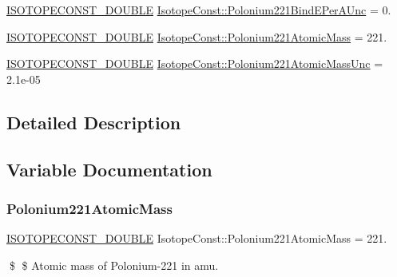 \begin{DoxyCompactItemize}
\mbox{\hyperlink{group___isotope_const-_macros_ga8f45a7272ce02c0b4c65c44636ed719a}{I\+S\+O\+T\+O\+P\+E\+C\+O\+N\+S\+T\+\_\+\+D\+O\+U\+B\+LE}} \mbox{\hyperlink{group___isotope_const-_polonium-_po221_gae882504366358f4c5ef70f4c170511be}{Isotope\+Const\+::\+Polonium221\+Bind\+E\+Per\+A\+Unc}} = 0.
\item 
\mbox{\hyperlink{group___isotope_const-_macros_ga8f45a7272ce02c0b4c65c44636ed719a}{I\+S\+O\+T\+O\+P\+E\+C\+O\+N\+S\+T\+\_\+\+D\+O\+U\+B\+LE}} \mbox{\hyperlink{group___isotope_const-_polonium-_po221_gacbb3136858462922944b43b2a12a97c8}{Isotope\+Const\+::\+Polonium221\+Atomic\+Mass}} = 221.
\item 
\mbox{\hyperlink{group___isotope_const-_macros_ga8f45a7272ce02c0b4c65c44636ed719a}{I\+S\+O\+T\+O\+P\+E\+C\+O\+N\+S\+T\+\_\+\+D\+O\+U\+B\+LE}} \mbox{\hyperlink{group___isotope_const-_polonium-_po221_ga1d041d1ba0861f7403c661e0243b36c2}{Isotope\+Const\+::\+Polonium221\+Atomic\+Mass\+Unc}} = 2.\+1e-\/05
\end{DoxyCompactItemize}


\subsection{Detailed Description}


\subsection{Variable Documentation}
\mbox{\label{group___isotope_const-_polonium-_po221_gacbb3136858462922944b43b2a12a97c8}} 
\subsubsection{\texorpdfstring{Polonium221\+Atomic\+Mass}{Polonium221AtomicMass}}
{\footnotesize\ttfamily \mbox{\hyperlink{group___isotope_const-_macros_ga8f45a7272ce02c0b4c65c44636ed719a}{I\+S\+O\+T\+O\+P\+E\+C\+O\+N\+S\+T\+\_\+\+D\+O\+U\+B\+LE}} Isotope\+Const\+::\+Polonium221\+Atomic\+Mass = 221.}

\$ \$ Atomic mass of Polonium-\/221 in amu. \mbox{\label{group___isotope_const-_polonium-_po221_ga1d041d1ba0861f7403c661e0243b36c2}} 
